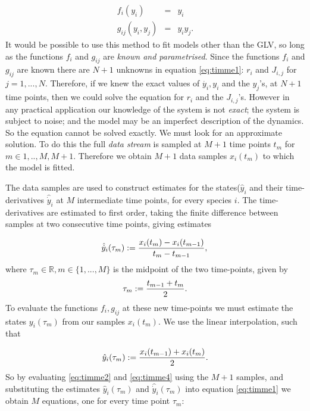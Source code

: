 \begin{eqnarray}
f_i(y_i) &=& y_i \\
g_{ij}(y_i,y_j) &=& y_iy_j.
\end{eqnarray}
%
It would be possible to use this method to fit models other than the GLV, so long as the functions $f_i$ and $g_{ij}$ are \emph{known and parametrised}. Since the functions $f_i$ and $g_{ij}$ are known there are $N+1$ unknowns in equation \eqref{eq:timme1}: $r_i$ and $J_{i,j}$ for $j=1,...,N$. Therefore, if we knew the exact values of $\dot{y_i},y_i$ and the $y_j$'s, at $N+1$ time points, then we could solve the equation for $r_i$ and the $J_{i,j}$'s. However in any practical application our knowledge of the system is not \emph{exact}; the system is subject to noise; and the model may be an imperfect description of the dynamics. So the equation cannot be solved exactly. We must look for an approximate solution. To do this the full \emph{data stream} is sampled at $M+1$ time points $t_m$ for $m \in {1,..,M,M+1}$. Therefore we obtain $M+1$ data samples $x_i(t_m)$ to which the model is fitted. 

The data samples are used to construct estimates for the states($\hat{y}_i$ and their time-derivatives $\hat{\dot{y}}_i$ at $M$ intermediate time points, for every species $i$. The time-derivatives are estimated to first order, taking the finite difference between samples at two consecutive time points, giving estimates

\begin{equation}\label{eq:timme2}
\hat{\dot{y}}_{i}(\tau_m) := \frac{x_i(t_m) - x_i(t_{m-1})}{t_m - t_{m-1}},\\
\end{equation}
%
where $\tau_m \in{\mathbb{R}}, m \in{\{1,...,M\}}$ is the midpoint of the two time-points, given by
%
\begin{equation}\label{eq:timme3}
\tau_m := \frac{t_{m-1} + t_{m}}{2}.\\
\end{equation}
%
To evaluate the functions $f_i, g_{ij}$ at these new time-points we must estimate the states $y_i(\tau_m)$ from our samples $x_i(t_m)$. We use the linear interpolation, such that

\begin{equation}\label{eq:timme4}
\hat{y}_{i}(\tau_m) := \frac{x_i(t_{m-1}) + x_i(t_{m})}{2}.\\
\end{equation}
%
So by evaluating \eqref{eq:timme2} and \eqref{eq:timme4} using the $M+1$ samples, and substituting the estimates $\hat{y}_i(\tau_m)$ and $\hat{\dot{y}}_i(\tau_m)$ into equation \eqref{eq:timme1} we obtain $M$ equations, one for every time point $\tau_m$:

